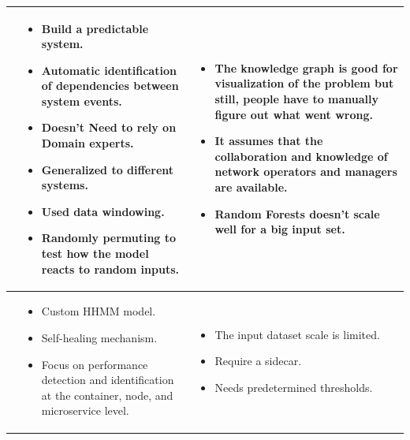 \begin{longtable}{| p{25mm} | p{62mm} | p{62mm} |}
    \cite{gonzalez2017root} &
    \vspace{-8mm}
    \begin{itemize}[leftmargin=3mm,noitemsep,nolistsep] 
        \item Build a predictable system.
        \item Automatic identification of dependencies between system events.
        \item Doesn't Need to rely on Domain experts.
        \item Generalized to different systems.
        \item Used data windowing.
        \item Randomly permuting to test how the model reacts to random inputs.
        \vspace{-7mm}
    \end{itemize} &
    \vspace{-8mm}
    \begin{itemize}[leftmargin=3mm,noitemsep,nolistsep] 
        \item The knowledge graph is good for visualization of the problem but still, people have to manually figure out what went wrong.
        \item It assumes that the collaboration and knowledge of network operators and managers are available.
        \item Random Forests doesn't scale well for a big input set.
        \vspace{-7mm}
    \end{itemize} \\ \hline
    
    \cite{samir2019dla} &
    \vspace{-8mm}
    \begin{itemize}[leftmargin=3mm,noitemsep,nolistsep] 
        \item Custom HHMM model.
        \item Self-healing mechanism.
        \item Focus on performance detection and identification at the container, node, and microservice level.
        \vspace{-7mm}
    \end{itemize} &
    \vspace{-8mm}
    \begin{itemize}[leftmargin=3mm,noitemsep,nolistsep] 
        \item The input dataset scale is limited.
        \item Require a sidecar.
        \item Needs predetermined thresholds.
        \vspace{-7mm}
    \end{itemize} \\ \hline
    

\end{longtable}
